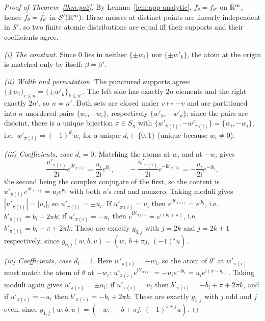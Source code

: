 \begin{proof}[Proof of Theorem~\ref{thm:po2}]
By Lemma~\ref{lem:app-analytic}, $f_\theta = f_{\theta'}$ on $\mathbb{R}^m$, hence
$\widehat{f_\theta} = \widehat{f_{\theta'}}$ in $\mathcal S'(\mathbb{R}^m)$. Dirac masses at distinct
points are linearly independent in $\mathcal S'$, so two finite atomic distributions are equal iff
their supports and their coefficients agree.

\emph{(i) The constant.} Since $0$ lies in neither $\{\pm w_i\}$ nor $\{\pm w'_k\}$, the atom at
the origin is matched only by itself: $\beta = \beta'$.

\emph{(ii) Width and permutation.} The punctured supports agree:
$\{\pm w_i\}_{i\le n} = \{\pm w'_k\}_{k \le n'}$. The left side has exactly $2n$ elements and the
right exactly $2n'$, so $n = n'$. Both sets are closed under $v \mapsto -v$ and are partitioned
into $n$ unordered pairs $\{w_i,-w_i\}$, respectively $\{w'_k,-w'_k\}$; since the pairs are
disjoint, there is a unique bijection $\pi \in S_n$ with
$\{w'_{\pi(i)}, -w'_{\pi(i)}\} = \{w_i, -w_i\}$, i.e.\ $w'_{\pi(i)} = (-1)^{d_i} w_i$ for a unique
$d_i \in \{0,1\}$ (unique because $w_i \neq 0$).

\emph{(iii) Coefficients, case $d_i = 0$.} Matching the atoms at $w_i$ and at $-w_i$ gives
\[
\frac{u'_{\pi(i)}}{2\mathrm i}e^{\mathrm i b'_{\pi(i)}} = \frac{u_i}{2\mathrm i}e^{\mathrm i b_i},
\qquad
-\frac{u'_{\pi(i)}}{2\mathrm i}e^{-\mathrm i b'_{\pi(i)}} = -\frac{u_i}{2\mathrm i}e^{-\mathrm i b_i},
\]
the second being the complex conjugate of the first, so the content is
$u'_{\pi(i)} e^{\mathrm i b'_{\pi(i)}} = u_i e^{\mathrm i b_i}$ with both $u$'s real and nonzero.
Taking moduli gives $|u'_{\pi(i)}| = |u_i|$, so $u'_{\pi(i)} = \pm u_i$. If $u'_{\pi(i)} = u_i$
then $e^{\mathrm i b'_{\pi(i)}} = e^{\mathrm i b_i}$, i.e.\ $b'_{\pi(i)} = b_i + 2\pi k$; if
$u'_{\pi(i)} = -u_i$ then $e^{\mathrm i b'_{\pi(i)}} = e^{\mathrm i (b_i + \pi)}$, i.e.\
$b'_{\pi(i)} = b_i + \pi + 2\pi k$. These are exactly $g_{0,j}$ with $j = 2k$ and $j = 2k+1$
respectively, since $g_{0,j}(w,b,u) = (w,\, b + \pi j,\, (-1)^j u)$.

\emph{(iv) Coefficients, case $d_i = 1$.} Here $w'_{\pi(i)} = -w_i$, so the atom of $\theta'$ at
$w'_{\pi(i)}$ must match the atom of $\theta$ at $-w_i$:
$u'_{\pi(i)}e^{\mathrm i b'_{\pi(i)}} = -u_i e^{-\mathrm i b_i} = u_i e^{\mathrm i(\pi - b_i)}$.
Taking moduli again gives $u'_{\pi(i)} = \pm u_i$; if $u'_{\pi(i)} = u_i$ then
$b'_{\pi(i)} = -b_i + \pi + 2\pi k$, and if $u'_{\pi(i)} = -u_i$ then
$b'_{\pi(i)} = -b_i + 2\pi k$. These are exactly $g_{1,j}$ with $j$ odd and $j$ even, since
$g_{1,j}(w,b,u) = (-w,\, -b + \pi j,\, (-1)^{1+j}u)$.


\end{proof}
